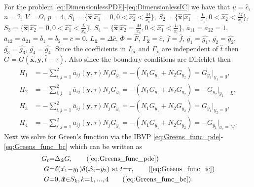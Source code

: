 \documentclass[\main/thesis.tex]{subfiles}
\begin{document}
For the problem \eqref{eq:DimensionlessPDE}-\eqref{eq:DimensionlessIC} we have that $u {=} \hat{c}$, $n {=} 2$, 
$V {=} \Omega$, $p {=} 4$, \newline 
$S_1 {=} \{ \boldsymbol{\hat{x}} | \hat{x_1} {=} 0, 0 {<} \hat{x_2} {<} \frac{M}{x_c} \}$, 
$S_2 {=} \{ \boldsymbol{\hat{x}} | \hat{x_1} {=} \frac{L}{x_c}, 0 {<} \hat{x_2} {<} \frac{M}{x_c} \}$,
$S_3 {=} \{ \boldsymbol{\hat{x}} | \hat{x_2} {=} 0, 0 {<} \hat{x_1} {<} \frac{L}{x_c} \}$, \newline
$S_4 {=} \{ \boldsymbol{\hat{x}} | \hat{x_2} {=} \frac{M}{x_c}, 0 {<} \hat{x_1} {<} \frac{L}{x_c} \}$, $\overline{a}_{11} {=} \overline{a}_{22} {=} 1$,
$\overline{a}_{12} {=} \overline{a}_{21} {=} \overline{b}_1 {=} \overline{b}_2 {=} \overline{c} {=} 0$, 
$L_{\boldsymbol{\hat{x}}} {=} \Delta \hat{c}$, $\overline{\Phi} {=} \hat{F}$, $\Gamma_{\boldsymbol{\hat{x}}} {=} \hat{c}$, $\overline{f} {=} \hat{f}$,
$\overline{g_1} {=} \hat{g_1}$, $\overline{g_2} {=} \hat{g_2}$, $\overline{g_3} {=} \hat{g_3}$, $\overline{g_4} {=} \hat{g_4}$.
Since the coefficients in $L_{\boldsymbol{\hat{x}}}$ and $\Gamma_{\boldsymbol{\hat{x}}}$ are independent of $\hat{t}$ then $G {=} G(\boldsymbol{\hat{x}}, \boldsymbol{y}, \hat{t} {-} \tau)$. Also since the boundary conditions are Dirichlet then
\begin{align}
H_1 &{=} {-}\sum_{i,j{=}1}^{2} \overline{a}_{ij}(\boldsymbol{y}, \tau) N_j G_{y_i} {=} {-}(N_1 G_{y_1} {+} N_2 G_{y_2}) {=} G_{y_2} |_{y_1{=}0},
\label{eq:H1}\\
H_2 &{=} {-}\sum_{i,j{=}1}^{2} \overline{a}_{ij}(\boldsymbol{y}, \tau) N_j G_{y_i} {=} {-}(N_1 G_{y_1} {+} N_2 G_{y_2}) {=} {-}G_{y_2} |_{y_1{=}L},
\label{eq:H2}\\
H_3 & {=} {-}\sum_{i,j{=}1}^{2} \overline{a}_{ij}(\boldsymbol{y}, \tau) N_j G_{y_i} {=} {-}(N_1 G_{y_1} {+} N_2 G_{y_2}) {=} G_{y_1} |_{y_2{=}0},
\label{eq:H3}\\
H_4 &{=} {-}\sum_{i,j{=}1}^{2} \overline{a}_{ij}(\boldsymbol{y}, \tau) N_j G_{y_i} {=} {-}(N_1 G_{y_1} {+} N_2 G_{y_2}) {=} {-}G_{y_1} |_{y_2{=}M}
\label{eq:H4}.
\end{align}
Next we solve for Green's function via the IBVP \eqref{eq:Greens_func_pde}-\eqref{eq:Greens_func_bc} which can be written as
\begin{align*}
G_t &{=} \Delta_{\boldsymbol{\hat{x}}} G,\tag{\ref{eq:Greens_func_pde}}\\
G &{=} \delta(\hat{x_1}{-}y_1)\delta(\hat{x_2}{-}y_2) \text{ at } t {=} \tau,\tag{\ref{eq:Greens_func_ic}}\\
G &{=} 0, \boldsymbol{\hat{x}} {\in} S_k, k{=}1, ..., 4 \tag{\ref{eq:Greens_func_bc}}.
\end{align*}
\end{document}
